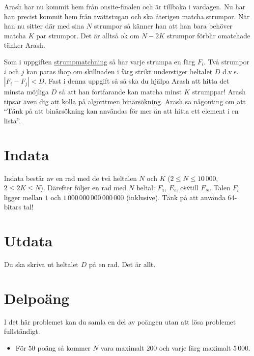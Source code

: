 
Arash har nu kommit hem från onsite-finalen och är tillbaka i
vardagen. Nu har han precist kommit hem från tvättstugan och ska
återigen matcha strumpor. När han nu sitter där med sina $N$ strumpor
så känner han att han bara behöver matcha $K$ par strumpor. Det
är alltså ok om $N-2K$ strumpor förblir omatchade tänker Arash. 

Som i uppgiften \href{https://po.scrool.se/problems/strumpor}{strumpmatchning}
så har varje strumpa en färg $F_i$. Två strumpor $i$ och $j$ kan paras ihop om
skillnaden i färg strikt understiger heltalet $D$ d.v.s. $|F_{i} - F_{j}|<D$.
Fast i denna uppgift så så ska du hjälpa Arash att hitta det minsta möjliga $D$
så att han fortfarande kan matcha minst $K$ strumppar! Arash tipsar även dig
att kolla på algoritmen
\href{http://www.progolymp.se/Oldpage/ioitraning/dictionary.htm}{binärsökning}.
Arash sa någonting om att ``Tänk på att binärsökning kan användas för mer än
att hitta ett element i en lista''.

\section*{Indata}

Indata består av en rad med de två heltalen $N$ och $K$ ($2 \le N
\le 10\,000$, $2 \le 2K \le N$). Därefter följer en rad med $N$
heltal: $F_1$, $F_2$, o\.s\.v\. till $F_N$. Talen $F_i$ ligger mellan $1$
och $1\,000\,000\,000\,000\,000$ (inklusive). Tänk på att använda
64-bitars tal!

\section*{Utdata}

Du ska skriva ut heltalet $D$ på en rad. Det är allt.

\section*{Delpoäng}

I det här problemet kan du samla en del av poängen utan att lösa
problemet fullständigt.

\begin{itemize}
    \item För $50$ poäng så kommer $N$ vara maximalt $200$ och varje färg maximalt $5\,000$.
\end{itemize}
